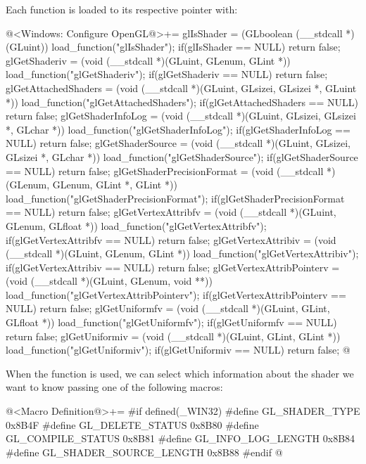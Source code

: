 Each function is loaded to its respective pointer with:

\iniciocodigo
@<Windows: Configure OpenGL@>+=
glIsShader = (GLboolean (__stdcall *)(GLuint)) load_function("glIsShader");
if(glIsShader == NULL) return false;
glGetShaderiv = (void (__stdcall *)(GLuint, GLenum, GLint *))
                   load_function("glGetShaderiv");
if(glGetShaderiv == NULL) return false;
glGetAttachedShaders = (void (__stdcall *)(GLuint, GLsizei, GLsizei *, GLuint *))
                         load_function("glGetAttachedShaders");
if(glGetAttachedShaders == NULL) return false;
glGetShaderInfoLog = (void (__stdcall *)(GLuint, GLsizei, GLsizei *, GLchar *))
                         load_function("glGetShaderInfoLog");
if(glGetShaderInfoLog == NULL)  return false;
glGetShaderSource = (void (__stdcall *)(GLuint, GLsizei, GLsizei *, GLchar *))
                       load_function("glGetShaderSource");
if(glGetShaderSource == NULL) return false;
glGetShaderPrecisionFormat = (void (__stdcall *)(GLenum, GLenum, GLint *,
                                                 GLint *))
                                load_function("glGetShaderPrecisionFormat");
if(glGetShaderPrecisionFormat == NULL) return false;
glGetVertexAttribfv = (void (__stdcall *)(GLuint, GLenum, GLfloat *))
                         load_function("glGetVertexAttribfv");
if(glGetVertexAttribfv == NULL) return false;
glGetVertexAttribiv = (void (__stdcall *)(GLuint, GLenum, GLint *))
                        load_function("glGetVertexAttribiv");
if(glGetVertexAttribiv == NULL) return false;
glGetVertexAttribPointerv = (void (__stdcall *)(GLuint, GLenum, void **))
                               load_function("glGetVertexAttribPointerv");
if(glGetVertexAttribPointerv == NULL) return false;
glGetUniformfv = (void (__stdcall *)(GLuint, GLint, GLfloat *))
                     load_function("glGetUniformfv");
if(glGetUniformfv == NULL) return false;
glGetUniformiv = (void (__stdcall *)(GLuint, GLint, GLint *))
                     load_function("glGetUniformiv");
if(glGetUniformiv == NULL) return false;
@
\fimcodigo

When the function  is used, we can select
which information about the shader we want to know passing one of the
following macros:

\iniciocodigo
@<Macro Definition@>+=
#if defined(_WIN32)
#define GL_SHADER_TYPE          0x8B4F
#define GL_DELETE_STATUS        0x8B80
#define GL_COMPILE_STATUS       0x8B81
#define GL_INFO_LOG_LENGTH      0x8B84
#define GL_SHADER_SOURCE_LENGTH 0x8B88
#endif
@
\fimcodigo

